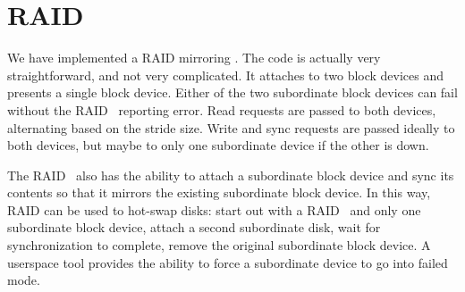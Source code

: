 \section{RAID}
\label{sec:raid}

We have implemented a RAID mirroring \module. The code is actually very
straightforward, and not very complicated. It attaches to two block devices and
presents a single block device. Either of the two subordinate block devices can
fail without the RAID \module\ reporting error. Read requests are passed to both
devices, alternating based on the stride size. Write and sync requests are
passed ideally to both devices, but maybe to only one subordinate device if the
other is down.

The RAID \module\ also has the ability to attach a subordinate block device and
sync its contents so that it mirrors the existing subordinate block device. In
this way, RAID can be used to hot-swap disks: start out with a RAID \module\ and
only one subordinate block device, attach a second subordinate disk, wait for
synchronization to complete, remove the original subordinate block device. A
userspace tool provides the ability to force a subordinate device to go into
failed mode.

